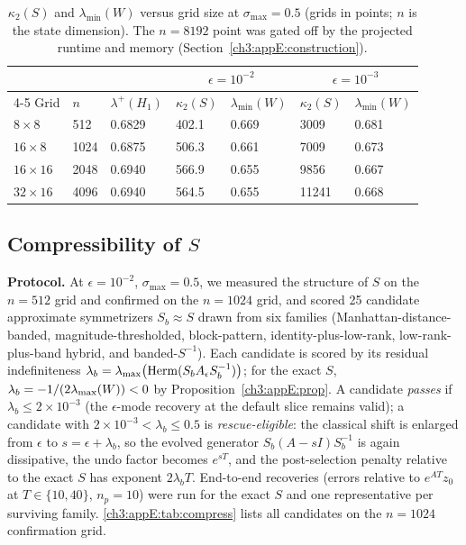 \begin{table}
\caption{$\kappa_2(S)$ and $\lambda_{\min}(W)$ versus grid size at
$\sigma_{\max}=0.5$ (grids in points; $n$ is the state dimension).
The $n=8192$ point was gated off by the projected runtime and memory
(Section~\protect\ref{ch3:appE:construction}).}
\label{ch3:appE:tab:scaling}
\begin{tabular}{lllllll}
\toprule
 & & & \multicolumn{2}{c}{$\epsilon=10^{-2}$} &
 \multicolumn{2}{c}{$\epsilon=10^{-3}$} \\
\cline{4-5}\cline{6-7}
Grid & $n$ & $\lambda^{+}(H_1)$ & $\kappa_2(S)$ & $\lambda_{\min}(W)$
 & $\kappa_2(S)$ & $\lambda_{\min}(W)$ \\
\midrule
$8\times8$ & 512 & 0.6829 & 402.1 & 0.669 & 3009 & 0.681 \\
$16\times8$ & 1024 & 0.6875 & 506.3 & 0.661 & 7009 & 0.673 \\
$16\times16$ & 2048 & 0.6940 & 566.9 & 0.655 & 9856 & 0.667 \\
$32\times16$ & 4096 & 0.6940 & 564.5 & 0.655 & 11241 & 0.668 \\
\bottomrule
\end{tabular}
\end{table}

\subsection{Compressibility of \texorpdfstring{$S$}{S}}
\label{ch3:appE:compress}

\noindent\textbf{Protocol.}  At $\epsilon=10^{-2}$, $\sigma_{\max}=0.5$, we
measured the structure of $S$ on the $n=512$ grid and confirmed on the
$n=1024$ grid, and scored 25 candidate approximate symmetrizers
$S_b\approx S$ drawn from six families (Manhattan-distance-banded,
magnitude-thresholded, block-pattern, identity-plus-low-rank,
low-rank-plus-band hybrid, and banded-$S^{-1}$).  Each candidate is
scored by its residual indefiniteness
$\lambda_b = \lambda_{\max}\bigl(\mathrm{Herm}(S_bA_\epsilon
S_b^{-1})\bigr)$; for the exact $S$,
$\lambda_b=-1/(2\lambda_{\max}(W))<0$ by Proposition~\ref{ch3:appE:prop}.  A
candidate \emph{passes} if $\lambda_b\le2\times10^{-3}$ (the
$\epsilon$-mode recovery at the default slice remains valid); a
candidate with $2\times10^{-3}<\lambda_b\le0.5$ is
\emph{rescue-eligible}: the classical shift is enlarged from
$\epsilon$ to $s=\epsilon+\lambda_b$, so the evolved generator
$S_b(A-sI)S_b^{-1}$ is again dissipative, the undo factor becomes
$e^{sT}$, and the post-selection penalty relative to the exact $S$ has
exponent $2\lambda_bT$.  End-to-end recoveries (errors relative to
$e^{AT}z_0$ at $T\in\{10,40\}$, $n_p=10$) were run for the exact $S$
and one representative per surviving family.
\ref{ch3:appE:tab:compress} lists all candidates on the $n=1024$
confirmation grid.

